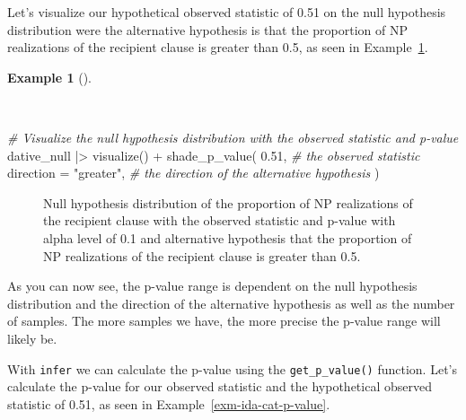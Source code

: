 \documentclass[
  letterpaper,
  DIV=11,
  numbers=noendperiod]{scrreprt}
\newenvironment{Shaded}{\begin{snugshade}}{\end{snugshade}}
\newcommand{\AttributeTok}[1]{\textcolor[rgb]{0.00,0.00,0.00}{#1}}
\newcommand{\CommentTok}[1]{\textcolor[rgb]{0.00,0.00,0.00}{\textit{#1}}}
\newcommand{\FloatTok}[1]{\textcolor[rgb]{0.00,0.00,0.00}{#1}}
\newcommand{\FunctionTok}[1]{\textcolor[rgb]{0.00,0.00,0.00}{#1}}
\newcommand{\NormalTok}[1]{\textcolor[rgb]{0.00,0.00,0.00}{#1}}
\newcommand{\SpecialCharTok}[1]{\textcolor[rgb]{0.00,0.00,0.00}{#1}}
\newcommand{\StringTok}[1]{\textcolor[rgb]{0.00,0.00,0.00}{#1}}
\theoremstyle{definition}
\newtheorem{example}{Example}[chapter]
\theoremstyle{remark}
\begin{document}
Let's visualize our hypothetical observed statistic of 0.51 on the null
hypothesis distribution were the alternative hypothesis is that the
proportion of NP realizations of the recipient clause is greater than
0.5, as seen in
Example~\ref{exm-ida-cat-null-hypothesis-obs-pval-greater}.

\begin{example}[]\protect\hypertarget{exm-ida-cat-null-hypothesis-obs-pval-greater}{}\label{exm-ida-cat-null-hypothesis-obs-pval-greater}

~

\begin{Shaded}
\begin{Highlighting}[]
\CommentTok{\# Visualize the null hypothesis distribution with the observed statistic and p{-}value}
\NormalTok{dative\_null }\SpecialCharTok{|\textgreater{}}
  \FunctionTok{visualize}\NormalTok{() }\SpecialCharTok{+}
  \FunctionTok{shade\_p\_value}\NormalTok{(}
    \FloatTok{0.51}\NormalTok{, }\CommentTok{\# the observed statistic}
    \AttributeTok{direction =} \StringTok{"greater"}\NormalTok{, }\CommentTok{\# the direction of the alternative hypothesis}
\NormalTok{  )}
\end{Highlighting}
\end{Shaded}

\begin{figure}[H]


\caption{\label{fig-ida-cat-null-hypothesis-obs-pval-greater}Null
hypothesis distribution of the proportion of NP realizations of the
recipient clause with the observed statistic and p-value with alpha
level of 0.1 and alternative hypothesis that the proportion of NP
realizations of the recipient clause is greater than 0.5.}

\end{figure}%

\end{example}

As you can now see, the p-value range is dependent on the null
hypothesis distribution and the direction of the alternative hypothesis
as well as the number of samples. The more samples we have, the more
precise the p-value range will likely be.

With \texttt{infer} we can calculate the p-value using the
\texttt{get\_p\_value()} function. Let's calculate the p-value for our
observed statistic and the hypothetical observed statistic of 0.51, as
seen in Example~\ref{exm-ida-cat-p-value}.
\end{document}
